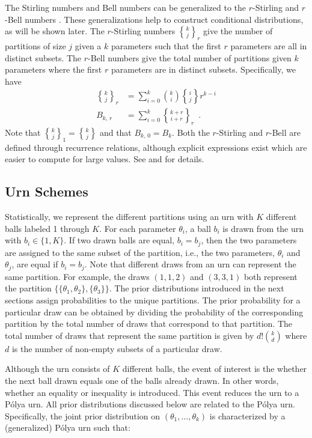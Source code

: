 \documentclass[11pt,a4paper]{article}
\theoremstyle{definition} %
\theoremstyle{case}
\DeclareRobustCommand{\stirling}{\genfrac\{\}{0pt}{}}
\newcommand{\rstirling}[3]{\stirling{#1}{#2}_{#3}}
\newcommand{\bellnum}[1]{B_{#1}}
\newcommand{\rbellnum}[2]{B_{#1,\,#2}}
\begin{document}
The Stirling numbers and Bell numbers can be generalized to the $r$-Stirling \parencite{broder1984r} and $r$-Bell numbers \parencite{mezo2011r}. These generalizations help to construct conditional distributions, as will be shown later. The $r$-Stirling numbers $\rstirling{k}{j}{r}$ give the number of partitions of size $j$ given a $k$ parameters such that the first $r$ parameters are all in distinct subsets. The $r$-Bell numbers give the total number of partitions given $k$ parameters where the first $r$ parameters are in distinct subsets. Specifically, we have
\begin{align}
    \rstirling{k}{j}{r} &= \sum_{i=0}^k \binom{k}{i}\stirling{i}{j}r^{k-i}\\
    \rbellnum{k}{r} &= \sum_{i=0}^k \rstirling{k+r}{i+r}{r} \enspace .
\end{align}
Note that $\rstirling{k}{j}{1} = \stirling{k}{j}$ and that $\rbellnum{k}{0} = \bellnum{k}$. Both the $r$-Stirling and $r$-Bell are defined through recurrence relations, although explicit expressions exist which are easier to compute for large values. See \textcite{broder1984r} and \textcite{mezo2011r} for details.

\subsection{Urn Schemes}
Statistically, we represent the different partitions using an urn with $K$ different balls labeled 1 through $K$. For each parameter $\theta_i$, a ball $b_i$ is drawn from the urn with $b_i \in \{1,K\}$. If two drawn balls are equal, $b_i = b_j$, then the two parameters are assigned to the same subset of the partition, i.e., the two parameters, $\theta_i$ and $\theta_j$, are equal if $b_i = b_j$. Note that different draws from an urn can represent the same partition. For example, the draws $(1, 1, 2)$ and $(3, 3, 1)$ both represent the partition $\{\{\theta_1, \theta_2\}, \{\theta_3\}\}$. The prior distributions introduced in the next sections assign probabilities to the unique partitions. The prior probability for a particular draw can be obtained by dividing the probability of the corresponding partition by the total number of draws that correspond to that partition. The total number of draws that represent the same partition is given by $d!\binom{k}{d}$ where $d$ is the number of non-empty subsets of a particular draw. 

Although the urn consists of $K$ different balls, the event of interest is the whether the next ball drawn equals one of the balls already drawn. In other words, whether an equality or inequality is introduced. This event reduces the urn to a P\'{o}lya urn. All prior distributions discussed below are related to the P\'{o}lya urn. Specifically, the joint prior distribution on $(\theta_1, \ldots, \theta_k)$ is characterized by a (generalized) P\'{o}lya urn such that:
\end{document}
